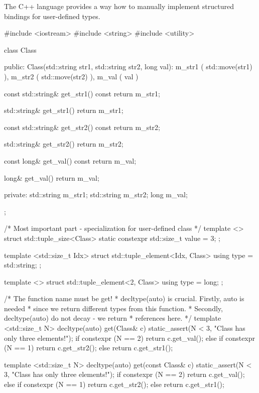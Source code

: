 \documentclass[../main]{subfiles}
\begin{document}
    The C++ language provides a way how to manually implement structured bindings for user-defined types.
\begin{Code}
    #include <iostream>
    #include <string>
    #include <utility>
    
    class Class
    {
    public:
        Class(std::string str1, std::string str2, long val):
            m_str1 ( std::move(str1) ),
            m_str2 ( std::move(str2) ),
            m_val ( val )
    {
    }
    
    const std::string& get_str1() const
    {
        return m_str1;
    }
    
    std::string& get_str1()
    {
        return m_str1;
    }
    
    const std::string& get_str2() const
    {
        return m_str2;
    }
    
    std::string& get_str2()
    {
        return m_str2;
    }
    
    const long& get_val() const
    {
        return m_val;
    }
    
    long& get_val()
    {
        return m_val;
    }
        
    private:
        std::string m_str1;
        std::string m_str2;
        long m_val;
    };
    
    /* Most important part - specialization for user-defined class */
    template <>
    struct std::tuple_size<Class>
    {
        static constexpr std::size_t value = 3;
    };
    
    template <std::size_t Idx>
    struct std::tuple_element<Idx, Class>
    {
        using type = std::string;
    };
    
    template <>
    struct std::tuple_element<2, Class>
    {
        using type  = long;
    };
    
    /* The function name must be get!
     * decltype(auto) is crucial. Firstly, auto is needed
     * since we return different types from this function.
     * Secondly, decltype(auto) do not decay - we return
     * references here.
     */
    template <std::size_t N>
    decltype(auto) get(Class& c)
    {
        static_assert(N < 3, "Class has only three elements!");
        if constexpr (N == 2)
        {
            return c.get_val();
        }
        else if constexpr (N == 1)
        {
            return c.get_str2();
        }
        else
        {
            return c.get_str1();
        }
    }
    
    template <std::size_t N>
    decltype(auto) get(const Class& c)
    {
        static_assert(N < 3, "Class has only three elements!");
        if constexpr (N == 2)
        {
            return c.get_val();
        }
        else if constexpr (N == 1)
        {
            return c.get_str2();
        }
        else
        {
            return c.get_str1();
        }
    }
    

\end{Code}
\end{document}
